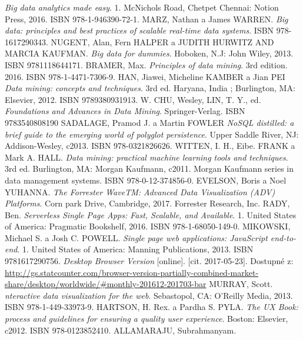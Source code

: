 \begin{thebibliography}{99}
\textit{Big data analytics made easy}.
1. McNichols Road, Chetpet Chennai: Notion Press, 2016. ISBN 978-1-946390-72-1.
MARZ, Nathan a James WARREN.
\textit{Big data: principles and best practices of scalable real-time data systems}.
ISBN 978-1617290343.
NUGENT, Alan, Fern HALPER a JUDITH HURWITZ AND MARCIA KAUFMAN.
\textit{Big data for dummies}.
Hoboken, N.J: John Wiley, 2013. ISBN 9781118644171.
BRAMER, Max.
\textit{Principles of data mining}.
3rd edition. 2016. ISBN 978-1-4471-7306-9.
HAN, Jiawei, Micheline KAMBER a Jian PEI
\textit{Data mining: concepts and techniques}.
3rd ed. Haryana, India ; Burlington, MA: Elsevier, 2012. ISBN 9789380931913.
W. CHU, Wesley, LIN, T. Y., ed.
\textit{Foundations and Advances in Data Mining}.
Springer-Verlag. ISBN 9783540808190
SADALAGE, Pramod J. a Martin FOWLER
\textit{NoSQL distilled: a brief guide to the emerging world of polyglot persistence}.
Upper Saddle River, NJ: Addison-Wesley, c2013. ISBN 978-0321826626.
WITTEN, I. H., Eibe. FRANK a Mark A. HALL.
\textit{Data mining: practical machine learning tools and techniques}.
3rd ed. Burlington, MA: Morgan Kaufmann, c2011. Morgan Kaufmann series in data management systems. ISBN 978-0-12-374856-0.
EVELSON, Boris a Noel YUHANNA.
\textit{The Forrester WaveTM: Advanced Data Visualization (ADV) Platforms}.
Corn park Drive, Cambridge, 2017. Forrester Research, Inc.
RADY, Ben.
\textit{Serverless Single Page Apps: Fast, Scalable, and Available}.
1. United States of America: Pragmatic Bookshelf, 2016. ISBN 978-1-68050-149-0.
MIKOWSKI, Michael S. a Josh C. POWELL.
\textit{Single page web applications: JavaScript end-to-end}.
1. United States of America: Manning Publications, 2013. ISBN 9781617290756.
\textit{Desktop Browser Version}
[online]. [cit. 2017-05-23]. Dostupné z: \url{http://gs.statcounter.com/browser-version-partially-combined-market-share/desktop/worldwide/\#monthly-201612-201703-bar}
MURRAY, Scott.
\textit{nteractive data visualization for the web}.
Sebastopol, CA: O'Reilly Media, 2013. ISBN 978-1-449-33973-9.
HARTSON, H. Rex. a Pardha S. PYLA.
\textit{The UX Book: process and guidelines for ensuring a quality user experience}.
Boston: Elsevier, c2012. ISBN 978-0123852410.
ALLAMARAJU, Subrahmanyam.

\end{thebibliography}

